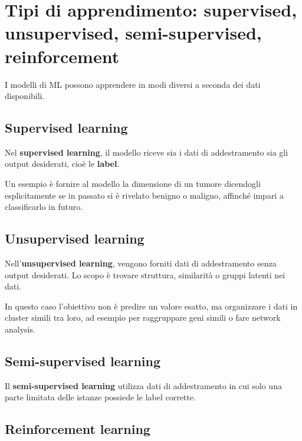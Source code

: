 \section{Tipi di apprendimento: supervised, unsupervised, semi-supervised, reinforcement}

I modelli di ML possono apprendere in modi diversi a seconda dei dati disponibili.

\subsection{Supervised learning}

Nel \textbf{supervised learning}, il modello riceve sia i dati di addestramento sia gli output desiderati, cioè le \textbf{label}.

\begin{notaprof}
Un esempio è fornire al modello la dimensione di un tumore dicendogli esplicitamente se in passato si è rivelato benigno o maligno, affinché impari a classificarlo in futuro.
\end{notaprof}

\subsection{Unsupervised learning}

Nell'\textbf{unsupervised learning}, vengono forniti dati di addestramento senza output desiderati. Lo scopo è trovare struttura, similarità o gruppi latenti nei dati.

\begin{notaprof}
In questo caso l'obiettivo non è predire un valore esatto, ma organizzare i dati in cluster simili tra loro, ad esempio per raggruppare geni simili o fare network analysis.
\end{notaprof}

\subsection{Semi-supervised learning}

\begin{notaslide}
Il \textbf{semi-supervised learning} utilizza dati di addestramento in cui solo una parte limitata delle istanze possiede le label corrette.
\end{notaslide}

\subsection{Reinforcement learning}

